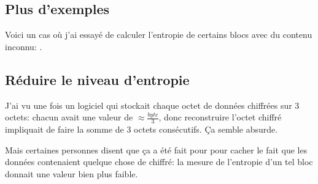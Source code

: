 \subsection{Plus d'exemples}

Voici un cas où j'ai essayé de calculer l'entropie de certains blocs avec du
contenu inconnu: .



\subsection{Réduire le niveau d'entropie}

J'ai vu une fois un logiciel qui stockait chaque octet de données chiffrées sur 3 octets:
chacun avait une valeur de {\Large $\approx \frac{byte}{3}$}, donc reconstruire
l'octet chiffré impliquait de faire la somme de 3 octets consécutifs.
Ça semble absurde.

Mais certaines personnes disent que ça a été fait pour pour cacher le fait que les
données contenaient quelque chose de chiffré: la mesure de l'entropie d'un tel bloc
donnait une valeur bien plus faible.

